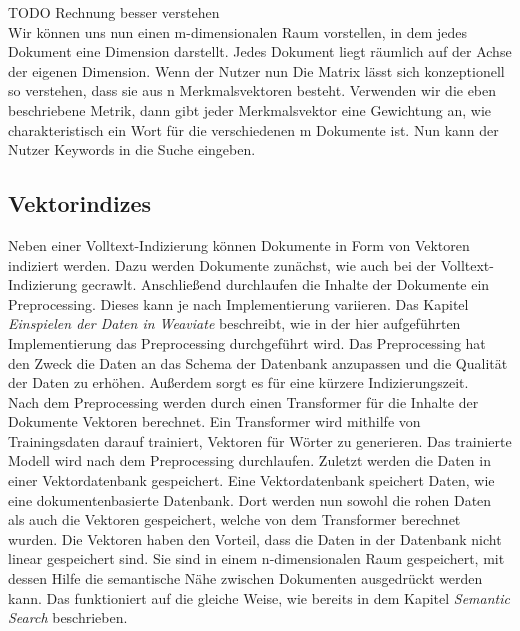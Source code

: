 TODO Rechnung besser verstehen\\

Wir können uns nun einen m-dimensionalen Raum vorstellen, in dem jedes Dokument eine Dimension darstellt.
Jedes Dokument liegt räumlich auf der Achse der eigenen Dimension.
Wenn der Nutzer nun 
Die Matrix lässt sich konzeptionell so verstehen, dass sie aus n Merkmalsvektoren besteht.
Verwenden wir die eben beschriebene Metrik, dann gibt jeder Merkmalsvektor eine Gewichtung an, wie charakteristisch ein Wort für die verschiedenen m Dokumente ist.
Nun kann der Nutzer Keywords in die Suche eingeben.

\subsection{Vektorindizes}
Neben einer Volltext-Indizierung können Dokumente in Form von Vektoren indiziert werden.
Dazu werden Dokumente zunächst, wie auch bei der Volltext-Indizierung gecrawlt.
Anschließend durchlaufen die Inhalte der Dokumente ein Preprocessing.
Dieses kann je nach Implementierung variieren.
Das Kapitel \textit{Einspielen der Daten in Weaviate} beschreibt, wie in der hier aufgeführten Implementierung das Preprocessing durchgeführt wird.
Das Preprocessing hat den Zweck die Daten an das Schema der Datenbank anzupassen und die Qualität der Daten zu erhöhen.
Außerdem sorgt es für eine kürzere Indizierungszeit.\\

Nach dem Preprocessing werden durch einen Transformer für die Inhalte der Dokumente Vektoren berechnet.
Ein Transformer wird mithilfe von Trainingsdaten darauf trainiert, Vektoren für Wörter zu generieren.
Das trainierte Modell wird nach dem Preprocessing durchlaufen.
Zuletzt werden die Daten in einer Vektordatenbank gespeichert.
Eine Vektordatenbank speichert Daten, wie eine dokumentenbasierte Datenbank.
Dort werden nun sowohl die rohen Daten als auch die Vektoren gespeichert, welche von dem Transformer berechnet wurden.
Die Vektoren haben den Vorteil, dass die Daten in der Datenbank nicht linear gespeichert sind.
Sie sind in einem n-dimensionalen Raum gespeichert, mit dessen Hilfe die semantische Nähe zwischen Dokumenten ausgedrückt werden kann.
Das funktioniert auf die gleiche Weise, wie bereits in dem Kapitel \textit{Semantic Search} beschrieben.